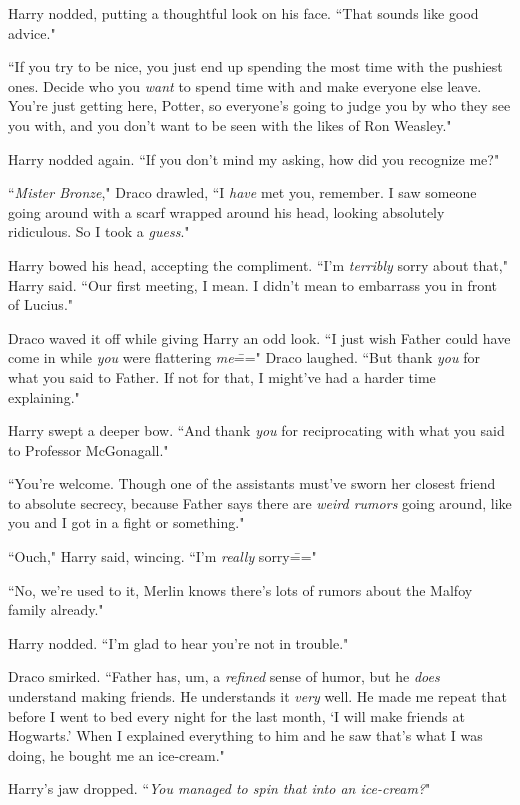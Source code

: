 Harry nodded, putting a thoughtful look on his face. ``That sounds like good advice."

``If you try to be nice, you just end up spending the most time with the pushiest ones. Decide who you \emph{want} to spend time with and make everyone else leave. You're just getting here, Potter, so everyone's going to judge you by who they see you with, and you don't want to be seen with the likes of Ron Weasley."

Harry nodded again. ``If you don't mind my asking, how did you recognize me?"

``\emph{Mister Bronze}," Draco drawled, ``I \emph{have} met you, remember. I saw someone going around with a scarf wrapped around his head, looking absolutely ridiculous. So I took a \emph{guess}."

Harry bowed his head, accepting the compliment. ``I'm \emph{terribly} sorry about that," Harry said. ``Our first meeting, I mean. I didn't mean to embarrass you in front of Lucius."

Draco waved it off while giving Harry an odd look. ``I just wish Father could have come in while \emph{you} were flattering \emph{me}\===" Draco laughed. ``But thank \emph{you} for what you said to Father. If not for that, I might've had a harder time explaining."

Harry swept a deeper bow. ``And thank \emph{you} for reciprocating with what you said to Professor McGonagall."

``You're welcome. Though one of the assistants must've sworn her closest friend to absolute secrecy, because Father says there are \emph{weird rumors} going around, like you and I got in a fight or something."

``Ouch," Harry said, wincing. ``I'm \emph{really} sorry\==="

``No, we're used to it, Merlin knows there's lots of rumors about the Malfoy family already."

Harry nodded. ``I'm glad to hear you're not in trouble."

Draco smirked. ``Father has, um, a \emph{refined} sense of humor, but he \emph{does} understand making friends. He understands it \emph{very} well. He made me repeat that before I went to bed every night for the last month, `I will make friends at Hogwarts.' When I explained everything to him and he saw that's what I was doing, he bought me an ice-cream."

Harry's jaw dropped. ``\emph{You managed to spin that into an ice-cream?}"

